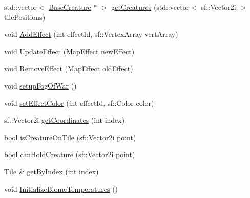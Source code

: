 \begin{DoxyCompactItemize}
\item 
std\+::vector$<$ \mbox{\hyperlink{class_base_creature}{Base\+Creature}} $\ast$ $>$ \mbox{\hyperlink{class_map_a5b232a4d35b914192077be84d35f3354}{get\+Creatures}} (std\+::vector$<$ sf\+::\+Vector2i $>$ tile\+Positions)
\item 
void \mbox{\hyperlink{class_map_a4392e61c95d9873f6f2bd4b46e988bba}{Add\+Effect}} (int effect\+Id, sf\+::\+Vertex\+Array vert\+Array)
\item 
void \mbox{\hyperlink{class_map_a7ba59d3c72accc7e8af4624f8e0abe69}{Update\+Effect}} (\mbox{\hyperlink{class_map_effect}{Map\+Effect}} new\+Effect)
\item 
void \mbox{\hyperlink{class_map_a0165980338b5bb5739a05dee4d4b341b}{Remove\+Effect}} (\mbox{\hyperlink{class_map_effect}{Map\+Effect}} old\+Effect)
\item 
void \mbox{\hyperlink{class_map_a7a4b37de2b84f1d1820a9b1e8a4ab5ab}{setup\+Fog\+Of\+War}} ()
\item 
void \mbox{\hyperlink{class_map_a05c00323732bd95a14d92fe96f95474d}{set\+Effect\+Color}} (int effect\+Id, sf\+::\+Color color)
\item 
sf\+::\+Vector2i \mbox{\hyperlink{class_map_abe8292f2baef82f73130f79f6b94f965}{get\+Coordinates}} (int index)
\item 
bool \mbox{\hyperlink{class_map_a22f7804f69757183a8b7093cf5b136ac}{is\+Creature\+On\+Tile}} (sf\+::\+Vector2i point)
\item 
bool \mbox{\hyperlink{class_map_a2ee6fd8a412c966c941784b226374bd1}{can\+Hold\+Creature}} (sf\+::\+Vector2i point)
\item 
\mbox{\hyperlink{class_tile}{Tile}} \& \mbox{\hyperlink{class_map_ae9cd08e70d2549c046acbfab085d421c}{get\+By\+Index}} (int index)
\item 
void \mbox{\hyperlink{class_map_ae5a05885aef979310e900b8343679abd}{Initialize\+Biome\+Temperatures}} ()
\end{DoxyCompactItemize}
